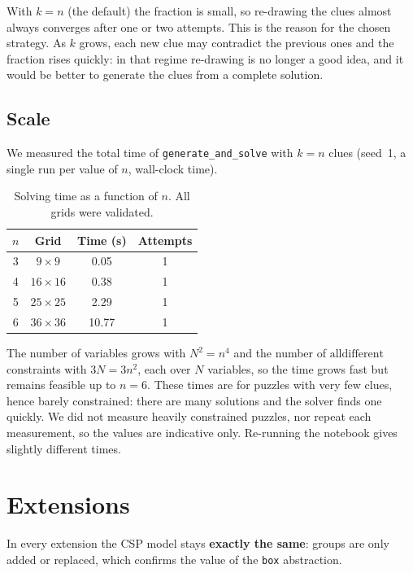 \documentclass[11pt,a4paper]{article}
\newcommand{\alldiff}{\mathrm{alldifferent}}
\begin{document}
With $k=n$ (the default) the fraction is small, so re-drawing the clues almost always converges after one or two attempts. This is the reason for the chosen strategy. As $k$ grows, each new clue may contradict the previous ones and the fraction rises quickly: in that regime re-drawing is no longer a good idea, and it would be better to generate the clues from a complete solution.

\subsection{Scale}

We measured the total time of \texttt{generate\_and\_solve} with $k=n$ clues (seed~1, a single run per value of $n$, wall-clock time).

\begin{table}[h]
\centering
\begin{tabular}{cccc}
\toprule
$n$ & Grid & Time (s) & Attempts \\
\midrule
3 & $9\times 9$   & 0.05  & 1 \\
4 & $16\times 16$ & 0.38  & 1 \\
5 & $25\times 25$ & 2.29  & 1 \\
6 & $36\times 36$ & 10.77 & 1 \\
\bottomrule
\end{tabular}
\caption{Solving time as a function of $n$. All grids were validated.}
\label{tab:scale}
\end{table}

The number of variables grows with $N^2=n^4$ and the number of $\alldiff$ constraints with $3N=3n^2$, each over $N$ variables, so the time grows fast but remains feasible up to $n=6$. These times are for puzzles with very few clues, hence barely constrained: there are many solutions and the solver finds one quickly. We did not measure heavily constrained puzzles, nor repeat each measurement, so the values are indicative only. Re-running the notebook gives slightly different times.

\section{Extensions}\label{sec:ext}

In every extension the CSP model stays \textbf{exactly the same}: groups are only added or replaced, which confirms the value of the \texttt{box} abstraction.
\end{document}
